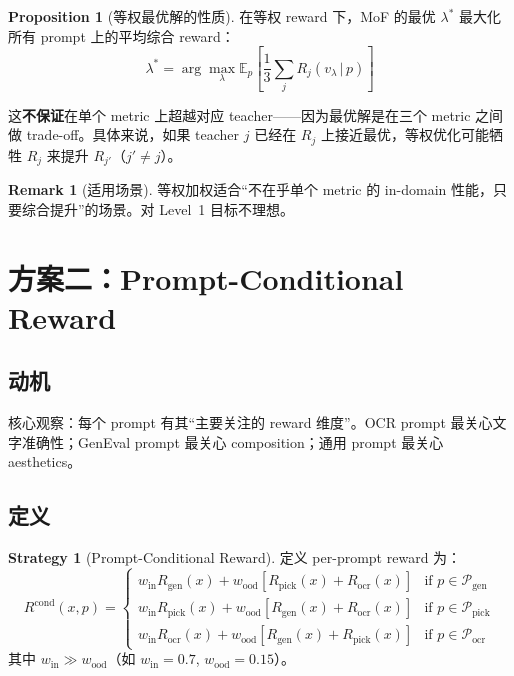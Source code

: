 \documentclass[11pt,a4paper]{article}
\newcommand{\E}{\mathbb{E}}
\newcommand{\reward}{R}
\theoremstyle{definition}
\newtheorem{remark}{Remark}
\newtheorem{proposition}{Proposition}
\newtheorem{strategy}{Strategy}
\begin{document}
\begin{proposition}[等权最优解的性质]
在等权 reward 下，MoF 的最优 $\lambda^*$ 最大化所有 prompt 上的平均综合 reward：
\begin{equation}
\lambda^* = \arg\max_\lambda \E_p\!\left[\frac{1}{3}\sum_j R_j(v_\lambda \,|\, p)\right]
\end{equation}

这\textbf{不保证}在单个 metric 上超越对应 teacher——因为最优解是在三个 metric 之间做 trade-off。具体来说，如果 teacher $j$ 已经在 $R_j$ 上接近最优，等权优化可能牺牲 $R_j$ 来提升 $R_{j'}$（$j' \neq j$）。
\end{proposition}

\begin{remark}[适用场景]
等权加权适合``不在乎单个 metric 的 in-domain 性能，只要综合提升''的场景。对 Level~1 目标不理想。
\end{remark}

\section{方案二：Prompt-Conditional Reward}
\label{sec:conditional}

\subsection{动机}

核心观察：每个 prompt 有其``主要关注的 reward 维度''。OCR prompt 最关心文字准确性；GenEval prompt 最关心 composition；通用 prompt 最关心 aesthetics。

\subsection{定义}

\begin{strategy}[Prompt-Conditional Reward]
\label{strat:conditional}
定义 per-prompt reward 为：
\begin{equation}
\reward^{\mathrm{cond}}(x, p) = \begin{cases}
w_{\mathrm{in}} R_{\mathrm{gen}}(x) + w_{\mathrm{ood}} \left[R_{\mathrm{pick}}(x) + R_{\mathrm{ocr}}(x)\right] & \text{if } p \in \mathcal{P}_{\mathrm{gen}} \\
w_{\mathrm{in}} R_{\mathrm{pick}}(x) + w_{\mathrm{ood}} \left[R_{\mathrm{gen}}(x) + R_{\mathrm{ocr}}(x)\right] & \text{if } p \in \mathcal{P}_{\mathrm{pick}} \\
w_{\mathrm{in}} R_{\mathrm{ocr}}(x) + w_{\mathrm{ood}} \left[R_{\mathrm{gen}}(x) + R_{\mathrm{pick}}(x)\right] & \text{if } p \in \mathcal{P}_{\mathrm{ocr}}
\end{cases}
\label{eq:cond_reward}
\end{equation}
其中 $w_{\mathrm{in}} \gg w_{\mathrm{ood}}$（如 $w_{\mathrm{in}} = 0.7$, $w_{\mathrm{ood}} = 0.15$）。
\end{strategy}
\end{document}
